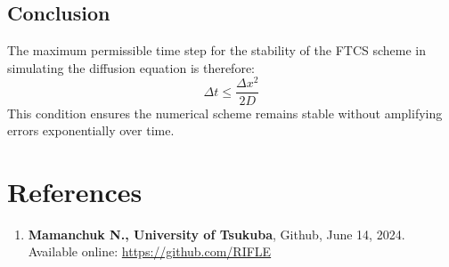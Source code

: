 \documentclass{article}
\begin{document}
\subsection{Conclusion}
The maximum permissible time step for the stability of the FTCS scheme in simulating the diffusion equation is therefore:
\[
\Delta t \leq \frac{\Delta x^2}{2D}
\]
This condition ensures the numerical scheme remains stable without amplifying errors exponentially over time.

\section*{References}
\begin{enumerate}
    \item \textbf{Mamanchuk N., University of Tsukuba}, Github, June 14, 2024. Available online: \url{https://github.com/RIFLE}
\end{enumerate}
\end{document}
